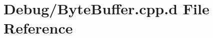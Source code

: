 \hypertarget{_debug_2_byte_buffer_8cpp_8d}{\section{\-Debug/\-Byte\-Buffer.cpp.\-d \-File \-Reference}
\label{_debug_2_byte_buffer_8cpp_8d}
}
